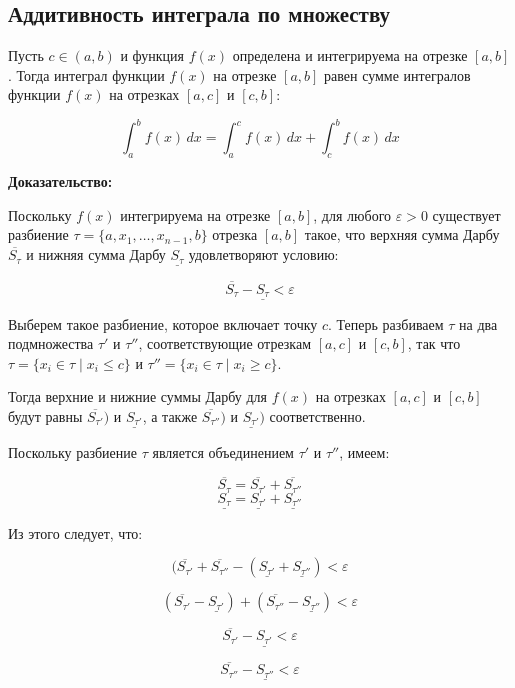 \documentclass[a4paper]{article}
\begin{document}
\begin{definit}
\hypertarget{p6}{}
\subsection*{Аддитивность интеграла по множеству}


Пусть $c \in (a, b)$ и функция $f(x)$ определена и интегрируема на отрезке $[a, b]$. Тогда интеграл функции $f(x)$ на отрезке $[a, b]$ равен сумме интегралов функции $f(x)$ на отрезках $[a, c]$ и $[c, b]$:

\[
\int_{a}^{b} f(x) \, dx = \int_{a}^{c} f(x) \, dx + \int_{c}^{b} f(x) \, dx
\]

\textbf{Доказательство:}

Поскольку $f(x)$ интегрируема на отрезке $[a, b]$, для любого $\varepsilon > 0$ существует разбиение $\tau = \{a, x_1, \dots, x_{n-1}, b\}$ отрезка $[a, b]$ такое, что верхняя сумма Дарбу $\overline{S_\tau}$ и нижняя сумма Дарбу $\underline{S_\tau}$ удовлетворяют условию:

\[
\overline{S_\tau} - \underline{S_\tau} < \varepsilon
\]

Выберем такое разбиение, которое включает точку $c$. Теперь разбиваем $\tau$ на два подмножества $\tau'$ и $\tau''$, соответствующие отрезкам $[a, c]$ и $[c, b]$, так что $\tau = \{x_i \in \tau \mid x_i \leq c\}$ и $\tau'' = \{x_i \in \tau \mid x_i \geq c\}$.

Тогда верхние и нижние суммы Дарбу для $f(x)$ на отрезках $[a, c]$ и $[c, b]$ будут равны $\overline{S_{\tau'}})$ и $\underline{S_{\tau'}}$, а также $\overline{S_{\tau''}})$ и $\underline{S_{\tau'}})$ соответственно.

Поскольку разбиение $\tau$ является объединением $\tau'$ и $\tau''$, имеем:

\[
\overline{S_{\tau}} = \overline{S_{\tau'}} + \overline{S_{\tau''}}
\]
\[
\underline{S_{\tau}} = \underline{S_{\tau'}} + \underline{S_{\tau''}}
\]

Из этого следует, что:

\[
(\overline{S_{\tau'}} + \overline{S_{\tau''}} - (\underline{S_{\tau'}} + \underline{S_{\tau''}}) < \varepsilon
\]

\[
(\overline{S_{\tau'}} - \underline{S_{\tau'}}) + (\overline{S_{\tau''}} - \underline{S_{\tau''}}) < \varepsilon
\]

\[
\overline{S_{\tau'}} - \underline{S_{\tau'}} < \varepsilon
\]

\[
\overline{S_{\tau''}} - \underline{S_{\tau''}} < \varepsilon
\]




\end{definit}
\end{document}
